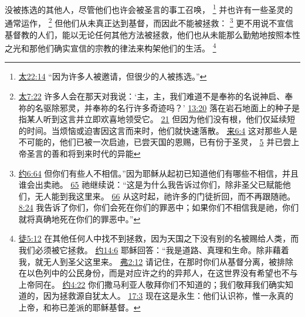 \documentclass[12pt, a4paper, oneside]{ctexart}
\newcounter{parnum}[section]
\newcommand{\N}{%
   \noindent\refstepcounter{parnum}%
    \makebox[\parindent][l]{\textbf{\arabic{parnum}.}}}
\begin{document}
\N 没被拣选的其他人，尽管他们也许会被圣言的事工召唤，
	\footnote {
		\href{https://biblehub.com/matthew/22-14.htm}{太22:14} “因为许多人被邀请，但很少的人被拣选。”
	}
	并也许有一些圣灵的通常运作，
	\footnote {
		\href{https://biblehub.com/matthew/7-22.htm}{太7:22} 许多人会在那天对我说：‘主，主，我们难道不是奉祢的名说神启、奉祢的名驱除邪灵，并奉祢的名行许多奇迹吗？’
		\href{https://biblehub.com/matthew/13-20.htm}{13:20} 落在岩石地面上的种子是指某人听到这言并立即欢喜地领受它。
		\href{https://biblehub.com/matthew/13-21.htm}{21} 但因为他们没有根，他们仅延续短的时间。当烦恼或迫害因这言而来时，他们就快速落散。
		\href{https://biblehub.com/hebrews/6-4.htm}{来6:4} 这对那些人是不可能的，他们已被一次启迪，已尝天国的恩赐，已有份于圣灵，
		\href{https://biblehub.com/hebrews/6-5.htm}{5} 并已尝上帝圣言的善和将到来时代的异能
	}
	但他们从未真正达到基督，而因此不能被拯救：
	\footnote {
		\href{https://biblehub.com/john/6-64.htm}{约6:64} 但你们有些人不相信。”因为耶稣从起初已知道他们有哪些不相信，并且谁会出卖祂。
		\href{https://biblehub.com/john/6-65.htm}{65} 祂继续说：“这是为什么我告诉过你们，除非圣父已赋能他们，无人能到我这里来。
		\href{https://biblehub.com/john/6-66.htm}{66} 从这时起，祂许多的门徒折回，而不再跟随祂。
		\href{https://biblehub.com/john/8-24.htm}{8:24} 我告诉了你们，你们会死在你们的罪恶中；如果你们不相信我是祂，你们就将真确地死在你们的罪恶中。”
	}
	更不用说不宣信基督教的人们，能以无论任何其他方法被拯救，他们也从未能那么勤勉地按照本性之光和那他们确实宣信的宗教的律法来构架他们的生活。
	\footnote {
		\href{https://biblehub.com/acts/4-12.htm}{徒5:12} 在其他任何人中找不到拯救，因为天国之下没有别的名被赐给人类，而我们必须被它拯救。
		\href{https://biblehub.com/john/14-6.htm}{约14:6} 耶稣回答：“我是道路、真理和生命。除非藉着我，就无人到圣父这里来。
		\href{https://biblehub.com/ephesians/2-12.htm}{弗2:12} 请记住，在那时你们从基督分离，被排除在以色列中的公民身份，而是对应许之约的异邦人，在这世界没有希望也不与上帝同在。
		\href{https://biblehub.com/john/4-22.htm}{约4:22} 你们撒马利亚人敬拜你们不知道的；我们敬拜我们确实知道的，因为拯救源自犹太人。
		\href{https://biblehub.com/john/17-3.htm}{17:3} 现在这是永生：他们认识祢，惟一永真的上帝，和祢已差派的耶稣基督。
	}
\end{document}
